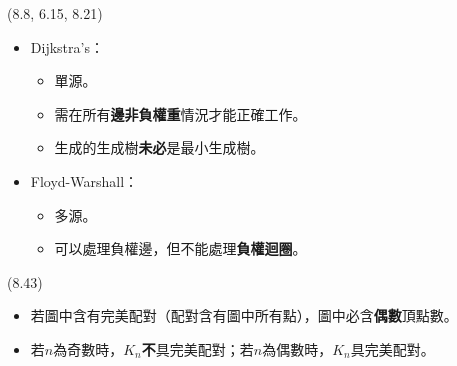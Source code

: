 \item \begin{theorem}{(8.8, 6.15, 8.21)} \quad\quad
    \begin{itemize}
        \item Dijkstra's：\begin{itemize}
            \item 單源。
            \item 需在所有\textbf{邊非負權重}情況才能正確工作。
            \item 生成的生成樹\textbf{未必}是最小生成樹。
        \end{itemize}
        \item Floyd-Warshall：\begin{itemize}
            \item 多源。
            \item 可以處理負權邊，但不能處理\textbf{負權迴圈}。
        \end{itemize}
    \end{itemize}
\end{theorem}

\item \begin{theorem}{(8.43)} \quad\quad
    \begin{itemize}
        \item 若圖中含有完美配對（配對含有圖中所有點），圖中必含\textbf{偶數}頂點數。
        \item 若$n$為奇數時，$K_n$\textbf{不}具完美配對；若$n$為偶數時，$K_n$具完美配對。
    \end{itemize}
\end{theorem}